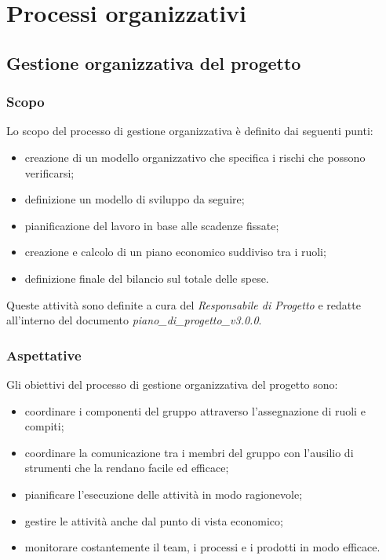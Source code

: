 \section{Processi organizzativi}

\subsection{Gestione organizzativa del progetto}

\subsubsection{Scopo}
Lo scopo del processo di gestione organizzativa è definito dai seguenti punti:
\begin{itemize}
\item creazione di un modello organizzativo che specifica i rischi che possono
verificarsi;
\item definizione un modello di sviluppo da seguire;
\item pianificazione del lavoro in base alle scadenze fissate;
\item creazione e calcolo di un piano economico suddiviso tra i ruoli;
\item definizione finale del bilancio sul totale delle spese.
\end{itemize}
Queste attività sono definite a cura del \textit{Responsabile di Progetto} e redatte all’interno del documento \textit{piano\_di\_progetto\_v3.0.0}.

\subsubsection{Aspettative}
Gli obiettivi del processo di gestione organizzativa del progetto sono: \begin{itemize}
\item coordinare i componenti del gruppo attraverso l’assegnazione di ruoli e
compiti;
\item coordinare la comunicazione tra i membri del gruppo con l’ausilio di strumenti che la rendano facile ed efficace;
\item pianificare l’esecuzione delle attività in modo ragionevole;
\item gestire le attività anche dal punto di vista economico;
\item monitorare costantemente il team, i processi e i prodotti in modo efficace.
\end{itemize}

